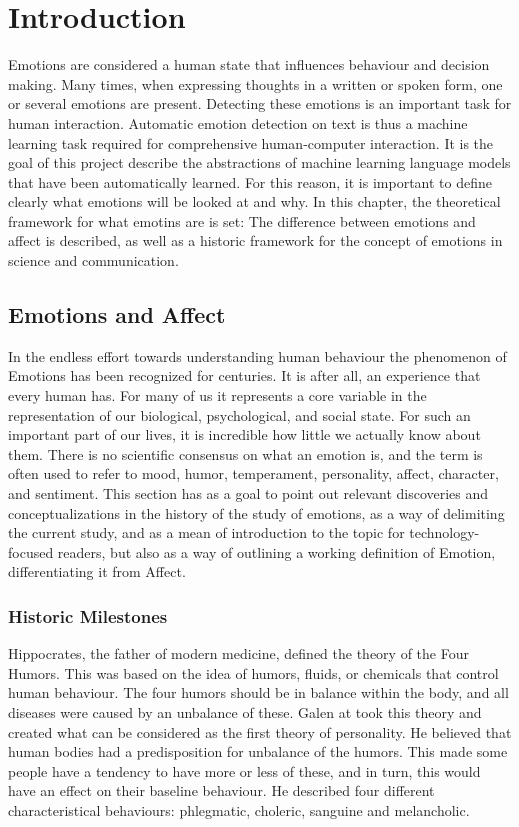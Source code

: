 \chapter{Introduction}\label{chap:Introduction}
Emotions are considered a human state that influences behaviour and decision making. Many times, when expressing thoughts in a written or spoken form, one or several emotions are present. Detecting these emotions is an important task for human interaction. Automatic emotion detection on text is thus a machine learning task required for comprehensive human-computer interaction.
It is the goal of this project describe the abstractions of machine learning language models that have been automatically learned. For this reason, it is important to define clearly what emotions will be looked at and why. In this chapter, the theoretical framework for what emotins are is set: The difference between emotions and affect is described, as well as a historic framework for the concept of emotions in science and communication.

\section{Emotions and Affect}\label{sec:Emotions and Affect}

In the endless effort towards understanding human behaviour the phenomenon of Emotions has been recognized for centuries. It is after all, an experience that every human has. For many of us it represents a core variable in the representation of our biological, psychological, and social state. For such an important part of our lives, it is incredible how little we actually know about them. There is no scientific consensus on what an emotion is, and the term is often used to refer to mood, humor, temperament, personality, affect, character, and sentiment.
This section has as a goal to point out relevant discoveries and conceptualizations in the history of the study of emotions, as a way of delimiting the current study, and as a mean of introduction to the topic for technology-focused readers, but also as a way of outlining a working definition of Emotion, differentiating it from Affect.

\subsection{Historic Milestones}\label{sub:Historic Milestones}

Hippocrates, the father of modern medicine, defined the theory of the Four Humors.
This was based on the idea of humors, fluids, or chemicals that control human behaviour.
The four humors should be in balance within the body, and all diseases were caused by an unbalance of these.\cite{kalachanis2015hippocrates}
Galen at took this theory and created what can be considered as the first theory of personality. He believed that human bodies had a predisposition for unbalance of the humors. This made some people have a tendency to have more or less of these, and in turn, this would have an effect on their baseline behaviour. He described four different characteristical behaviours: phlegmatic, choleric, sanguine and melancholic.\cite{irwin1947galen}

